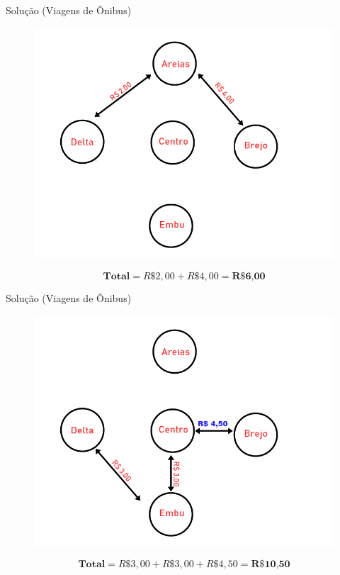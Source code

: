\documentclass{beamer}
\begin{document}
\begin{frame}{Solução (Viagens de Ônibus)}
\begin{figure}[ht]
\centering
\includegraphics[width=.8\textwidth]{DB1.png}
\label{fig:exampleFig2}
\end{figure}
\begin{equation*}
    \textbf{Total} = R\$2,00 + R\$4,00 = \textbf{R\$6,00}
\end{equation*}

\end{frame}

\begin{frame}{Solução (Viagens de Ônibus)}

\begin{figure}[ht]
\centering
\includegraphics[width=.8\textwidth]{DB2.png}
\label{fig:exampleFig2}
\end{figure}
\begin{equation*}
    \textbf{Total} = R\$3,00 + R\$3,00 + R\$4,50 = \textbf{R\$10,50}
\end{equation*}

\end{frame}
\end{document}
